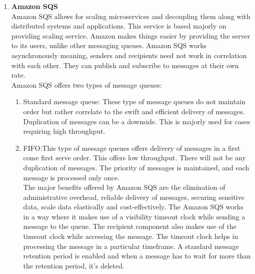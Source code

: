 \documentclass{IEEEtran}
\begin{document}
\begin{enumerate}
\begin{enumerate}
    \end{enumerate}
    \item \textbf{Amazon SQS} \\ Amazon SQS allows for scaling microservices and decoupling them along with distributed systems and applications. This service is based majorly on providing scaling service. Amazon makes things easier by providing the server to its users, unlike other messaging queues. Amazon SQS works asynchronously meaning, senders and recipients need not work in correlation with each other. They can publish and subscribe to messages at their own rate.\\ \cite{SQSDocumentation}
    Amazon SQS offers two types of message queues:
    \begin{enumerate}
        \item Standard message queue:
These type of message queues do not maintain order but rather correlate to the swift and efficient delivery of messages. Duplication of messages can be a downside. This is majorly used for cases requiring high throughput.\\
        \item FIFO:This type of message queues offers delivery of messages in a first come first serve order. This offers low throughput. There will not be any duplication of messages. The priority of messages is maintained, and each message is processed only once. \\ The major benefits offered by Amazon SQS are the elimination of administrative overhead, reliable delivery of messages, securing sensitive data, scale data elastically and cost-effectively. The Amazon SQS works in a way where it makes use of a visibility timeout clock while sending a  message to the queue. The recipient component also makes use of the timeout clock while accessing the message. The timeout clock helps in processing the message in a particular timeframe. A standard message retention period is enabled and when a message has to wait for more than the retention period, it’s deleted. \cite{SQSDocumentation}
    \end{enumerate}
\end{enumerate}
\end{document}
